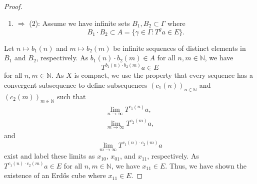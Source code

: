 \documentclass[
  british,
]{article}
\providecommand{\tightlist}{%
  \setlength{\itemsep}{0pt}\setlength{\parskip}{0pt}}
\theoremstyle{plain}
\theoremstyle{definition}
\theoremstyle{remark}
\newcommand{\Group}{{\Gamma}}
\newcommand{\GroupElement}{{\gamma}}
\newcommand{\ShiftSpace}{{X}}
\begin{document}
\begin{proof}
\leavevmode

\begin{enumerate}
\def\labelenumi{(\arabic{enumi})}
\tightlist
\item
  \(\Rightarrow\) (2): Assume we have infinite sets
  \(B_1,B_2\subset\Group\) where
  \[B_1\cdot B_2\subset A=\{\GroupElement\in\Group:T^ga\in E\}.\]
\end{enumerate}

Let \(n\mapsto b_1(n)\) and \(m\mapsto b_2(m)\) be infinite sequences of
distinct elements in \(B_1\) and \(B_2\), respectively. As
\(b_1(n)\cdot b_2(m)\in A\) for all \(n,m\in\mathbb{N}\), we have
\[T^{b_1(n)\cdot b_2(m)}a\in E \] for all \(n,m\in \mathbb{N}\). As
\(\ShiftSpace\) is compact, we use the property that every sequence has
a convergent subsequence to define subsequences
\((c_1(n))_{n\in\mathbb{N}}\) and \((c_2(m))_{m\in\mathbb{N}}\) such
that \begin{align*}
    \lim_{n\rightarrow\infty}T^{c_1(n)}a,
    \\\lim_{m\rightarrow\infty}T^{c_2(m)}a,
\end{align*} and \[\lim_{m\rightarrow\infty}T^{c_1(n)\cdot c_2(m)}a\]
exist and label these limits as \(x_{10}\), \(x_{01}\), and \(x_{11}\),
respectively. As \(T^{c_1(n)\cdot c_2(m)}a\in E\) for all
\(n,m\in\mathbb{N}\), we have \(x_{11}\in E\). Thus, we have shown the
existence of an Erdős cube where \(x_{11}\in E\).


\end{proof}
\end{document}
